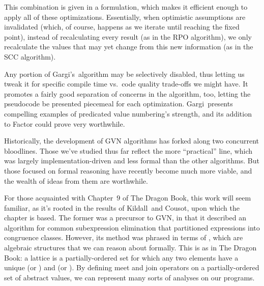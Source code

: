 This combination is given in a  formulation, which makes it
efficient enough to apply all of these optimizations.  Essentially, when
optimistic assumptions are invalidated (which, of course, happens as we iterate
until reaching the fixed point), instead of recalculating every result (as in
the \gls{RPO} algorithm), we only recalculate the values that may yet change
from this new information (as in the \gls{SCC} algorithm).

Any portion of Gargi's~algorithm may be selectively disabled,
thus letting us tweak it for specific compile time vs.~code quality trade-offs
we might have.  It promotes a fairly good separation of concerns in the
algorithm, too, letting the pseudocode be presented piecemeal for each
optimization.  Gargi~presents compelling examples of predicated
value numbering's strength, and its addition to Factor could prove very
worthwhile.

Historically, the development of \gls{GVN} algorithms has forked along two
concurrent bloodlines.  Those we've studied thus far reflect the more
``practical'' line, which was largely implementation-driven and less formal
than the other algorithms.  But those focused on formal reasoning have recently
become much more viable, and the wealth of ideas from them are worthwhile.

For those acquainted with Chapter~$9$ of The Dragon Book, this work
will seem familiar, as it's rooted in the results of Kildall~and
Cousot, upon which the chapter is based.  The former was a precursor
to \gls{GVN}, in that it described an algorithm for common subexpression
elimination that partitioned expressions into congruence classes.  However, its
method was phrased in terms of , which are algebraic structures
that we can reason about formally.  This is as in The Dragon
Book: a lattice is a partially-ordered set for which any two
elements have a unique  (or ) and
 (or ).  By defining meet and join
operators on a partially-ordered set of abstract values, we can represent many
sorts of analyses on our programs.


